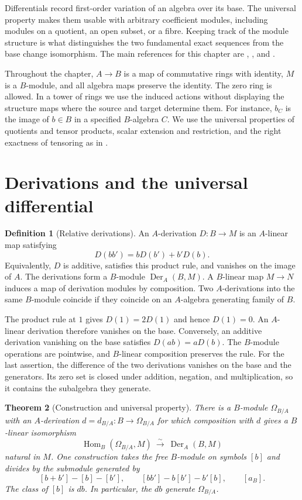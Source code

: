\documentclass[11pt,oneside,openany]{book}
\newtheorem{theorem}{Theorem}[chapter]
\theoremstyle{definition}
\newtheorem{definition}[theorem]{Definition}
\theoremstyle{remark}
\begin{document}
Differentials record first-order variation of an algebra over its base. The universal property makes them usable with arbitrary coefficient modules, including modules on a quotient, an open subset, or a fibre. Keeping track of the module structure is what distinguishes the two fundamental exact sequences from the base change isomorphism. The main references for this chapter are \cite[Chapter 16]{eisenbud}, \cite[Section 25]{matsumura}, and \cite[Section 10.131]{stacks}.

Throughout the chapter, $A\to B$ is a map of commutative rings with identity, $M$ is a $B$-module, and all algebra maps preserve the identity. The zero ring is allowed. In a tower of rings we use the induced actions without displaying the structure maps where the source and target determine them. For instance, $b_C$ is the image of $b\in B$ in a specified $B$-algebra $C$. We use the universal properties of quotients and tensor products, scalar extension and restriction, and the right exactness of tensoring as in \cite[Chapters 1 and 4]{p103}.

\section{Derivations and the universal differential}

\begin{definition}[Relative derivations]\label{res:KD-01}
An $A$-derivation $D:B\to M$ is an $A$-linear map satisfying
\[
 D(bb')=bD(b')+b'D(b).
\]
Equivalently, $D$ is additive, satisfies this product rule, and vanishes on the image of $A$. The derivations form a $B$-module $\operatorname{Der}_A(B,M)$. A $B$-linear map $M\to N$ induces a map of derivation modules by composition. Two $A$-derivations into the same $B$-module coincide if they coincide on an $A$-algebra generating family of $B$.
\end{definition}

The product rule at $1$ gives $D(1)=2D(1)$ and hence $D(1)=0$. An $A$-linear derivation therefore vanishes on the base. Conversely, an additive derivation vanishing on the base satisfies $D(ab)=aD(b)$. The $B$-module operations are pointwise, and $B$-linear composition preserves the rule. For the last assertion, the difference of the two derivations vanishes on the base and the generators. Its zero set is closed under addition, negation, and multiplication, so it contains the subalgebra they generate.

\begin{theorem}[Construction and universal property]\label{res:KD-02}
There is a $B$-module $\Omega_{B/A}$ with an $A$-derivation $d=d_{B/A}:B\to\Omega_{B/A}$ for which composition with $d$ gives a $B$-linear isomorphism
\[
 \operatorname{Hom}_B(\Omega_{B/A},M)\ \xrightarrow{\ \sim\ }\ \operatorname{Der}_A(B,M)
\]
natural in $M$. One construction takes the free $B$-module on symbols $[b]$ and divides by the submodule generated by
\[
 [b+b']-[b]-[b'],\qquad [bb']-b[b']-b'[b],\qquad [a_B].
\]
The class of $[b]$ is $db$. In particular, the $db$ generate $\Omega_{B/A}$.
\end{theorem}
\end{document}
